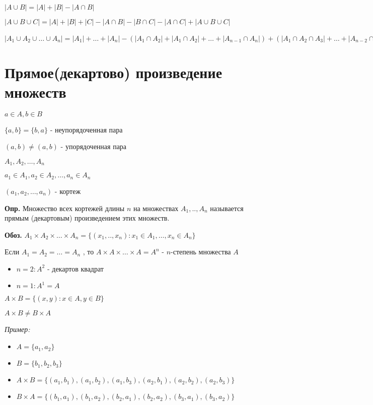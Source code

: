 \documentclass[10pt]{article}
\begin{document}
\par $|A \cup B| = |A| + |B| - |A \cap B|$
\par $|A \cup B \cup C| = |A| + |B| + |C| - |A \cap B| - |B \cap C| - |A \cap C| + |A \cup B \cup C|$
\par $|A_{1} \cup A_{2} \cup \dots \cup A_{n}| = |A_{1}| + \dots + |A_{n}| - (|A_{1} \cap A_{2}| + |A_{1} \cap A_{2}| + \dots + |A_{n - 1} \cap A_{n}|) + (|A_{1} \cap A_{2} \cap A_{3}| + \dots + |A_{n - 2} \cap A_{n - 1} \cap A_{n}|) - \dots + (-1)^{n-1} |A_{1} \cap A_{2} \cap \dots \cap A_{n}|$

\section*{Прямое(декартово) произведение множеств}
\par $a \in A, b \in B$
\par $\{ a, b \} = \{ b, a \}$ - неупорядоченная пара
\par $(a, b) \neq (a, b)$ - упорядоченная пара
\par 
\par $A_{1}, A_{2}, \dots, A_{n}$
\par $a_{1} \in A_{1}, a_{2} \in A_{2}, \dots, a_{n} \in A_{n}$
\par $(a_{1}, a_{2}, \dots, a_{n})$ - кортеж
\par\textbf{Опр.} Множество всех кортежей длины $n$ на множествах $A_{1}, .., A_{n}$ называется прямым (декартовым) произведением этих множеств.
\par\textbf{Обоз.} $A_{1} \times A_{2} \times \dots \times A_{n} = \{ (x_{1}, .., x_{n}): x_{1} \in A_{1}, \dots, x_{n} \in A_{n} \}$

\par Если $A_{1} = A_{2} = \dots = A_{n}$ , то $A \times A \times \dots \times A = A^n$ - $n$-степень множества $A$
\begin{itemize}
    \item $n = 2: A^2$ - декартов квадрат
    \item $n = 1: A^1 = A$
\end{itemize}

\par $A \times B = \{ (x, y): x \in A, y \in B \}$
\par $A \times B \neq B \times A$
\par\textit{Пример:}
\begin{itemize}
    \item $A = \{  a_{1}, a_{2} \}$
    \item $B = \{ b_{1}, b_{2}, b_{3} \}$
    \item $A \times B = \{ (a_{1}, b_{1}), (a_{1}, b_{2}), (a_{1}, b_{3}), (a_{2}, b_{1}), (a_{2}, b_{2}), (a_{2}, b_{3})\}$
    \item $B \times A = \{ (b_{1}, a_{1}), (b_{1}, a_{2}), (b_{2}, a_{1}), (b_{2}, a_{2}), (b_{3}, a_{1}), (b_{3}, a_{2})\}$
\end{itemize}
\end{document}
